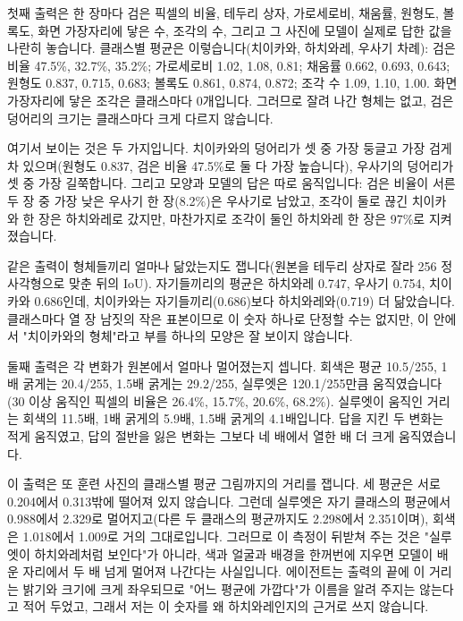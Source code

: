 \documentclass[11pt]{article}
\begin{document}
첫째 출력은 한 장마다 검은 픽셀의 비율, 테두리 상자, 가로세로비, 채움률, 원형도,
볼록도, 화면 가장자리에 닿은 수, 조각의 수, 그리고 그 사진에 모델이 실제로 답한
값을 나란히 놓습니다. 클래스별 평균은 이렇습니다(치이카와, 하치와레, 우사기
차례): 검은 비율 47.5\%, 32.7\%, 35.2\%; 가로세로비 1.02, 1.08, 0.81; 채움률
0.662, 0.693, 0.643; 원형도 0.837, 0.715, 0.683; 볼록도 0.861, 0.874, 0.872;
조각 수 1.09, 1.10, 1.00. 화면 가장자리에 닿은 조각은 클래스마다 0개입니다.
그러므로 잘려 나간 형체는 없고, 검은 덩어리의 크기는 클래스마다 크게 다르지
않습니다.

여기서 보이는 것은 두 가지입니다. 치이카와의 덩어리가 셋 중 가장 둥글고 가장
검게 차 있으며(원형도 0.837, 검은 비율 47.5\%로 둘 다 가장 높습니다), 우사기의
덩어리가 셋 중 가장 길쭉합니다. 그리고 모양과 모델의 답은 따로 움직입니다: 검은
비율이 서른두 장 중 가장 낮은 우사기 한 장(8.2\%)은 우사기로 남았고, 조각이 둘로
끊긴 치이카와 한 장은 하치와레로 갔지만, 마찬가지로 조각이 둘인 하치와레 한 장은
97\%로 지켜졌습니다.

같은 출력이 형체들끼리 얼마나 닮았는지도 잽니다(원본을 테두리 상자로 잘라 256
정사각형으로 맞춘 뒤의 IoU). 자기들끼리의 평균은 하치와레 0.747, 우사기 0.754,
치이카와 0.686인데, 치이카와는 자기들끼리(0.686)보다 하치와레와(0.719) 더
닮았습니다. 클래스마다 열 장 남짓의 작은 표본이므로 이 숫자 하나로 단정할 수는
없지만, 이 안에서 "치이카와의 형체"라고 부를 하나의 모양은 잘 보이지 않습니다.

둘째 출력은 각 변화가 원본에서 얼마나 멀어졌는지 셉니다. 회색은 평균
10.5/255, 1배 굵게는 20.4/255, 1.5배 굵게는 29.2/255, 실루엣은 120.1/255만큼
움직였습니다(30 이상 움직인 픽셀의 비율은 26.4\%, 15.7\%, 20.6\%, 68.2\%).
실루엣이 움직인 거리는 회색의 11.5배, 1배 굵게의 5.9배, 1.5배 굵게의 4.1배입니다.
답을 지킨 두 변화는 적게 움직였고, 답의 절반을 잃은 변화는 그보다 네 배에서 열한
배 더 크게 움직였습니다.

이 출력은 또 훈련 사진의 클래스별 평균 그림까지의 거리를 잽니다. 세 평균은 서로
0.204에서 0.313밖에 떨어져 있지 않습니다. 그런데 실루엣은 자기 클래스의 평균에서
0.988에서 2.329로 멀어지고(다른 두 클래스의 평균까지도 2.298에서 2.351이며),
회색은 1.018에서 1.009로 거의 그대로입니다. 그러므로 이 측정이 뒤받쳐 주는 것은
"실루엣이 하치와레처럼 보인다"가 아니라, 색과 얼굴과 배경을 한꺼번에 지우면
모델이 배운 자리에서 두 배 넘게 멀어져 나간다는 사실입니다. 에이전트는 출력의
끝에 이 거리는 밝기와 크기에 크게 좌우되므로 "어느 평균에 가깝다"가 이름을 알려
주지는 않는다고 적어 두었고, 그래서 저는 이 숫자를 왜 하치와레인지의 근거로 쓰지
않습니다.
\end{document}
